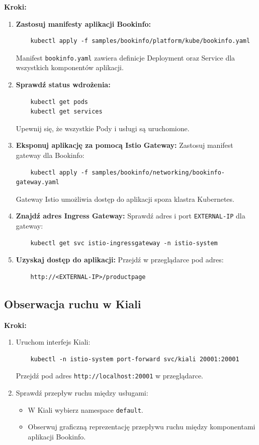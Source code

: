 \documentclass{article}
\begin{document}
\textbf{Kroki:}
\begin{enumerate}
    \item \textbf{Zastosuj manifesty aplikacji Bookinfo:}
    \begin{lstlisting}
    kubectl apply -f samples/bookinfo/platform/kube/bookinfo.yaml
    \end{lstlisting}
    Manifest \texttt{bookinfo.yaml} zawiera definicje Deployment oraz Service dla wszystkich komponentów aplikacji.

    \item \textbf{Sprawdź status wdrożenia:}
    \begin{lstlisting}
    kubectl get pods
    kubectl get services
    \end{lstlisting}
    Upewnij się, że wszystkie Pody i usługi są uruchomione.

    \item \textbf{Eksponuj aplikację za pomocą Istio Gateway:}
    Zastosuj manifest gateway dla Bookinfo:
    \begin{lstlisting}
    kubectl apply -f samples/bookinfo/networking/bookinfo-gateway.yaml
    \end{lstlisting}
    Gateway Istio umożliwia dostęp do aplikacji spoza klastra Kubernetes.

    \item \textbf{Znajdź adres Ingress Gateway:}
    Sprawdź adres i port \texttt{EXTERNAL-IP} dla gateway:
    \begin{lstlisting}
    kubectl get svc istio-ingressgateway -n istio-system
    \end{lstlisting}

    \item \textbf{Uzyskaj dostęp do aplikacji:}
    Przejdź w przeglądarce pod adres:
    \begin{lstlisting}
    http://<EXTERNAL-IP>/productpage
    \end{lstlisting}
\end{enumerate}

\subsection{Obserwacja ruchu w Kiali}

\textbf{Kroki:}
\begin{enumerate}
    \item Uruchom interfejs Kiali:
    \begin{lstlisting}
    kubectl -n istio-system port-forward svc/kiali 20001:20001
    \end{lstlisting}
    Przejdź pod adres \texttt{http://localhost:20001} w przeglądarce.

    \item Sprawdź przepływ ruchu między usługami:
    \begin{itemize}
        \item W Kiali wybierz namespace \texttt{default}.
        \item Obserwuj graficzną reprezentację przepływu ruchu między komponentami aplikacji Bookinfo.
    \end{itemize}
\end{enumerate}
\end{document}
